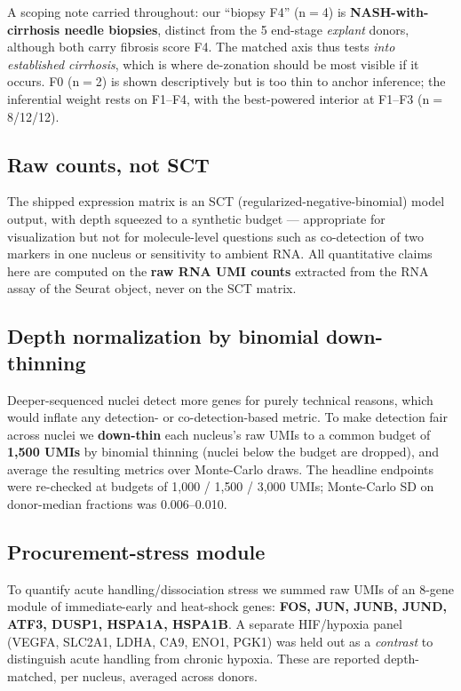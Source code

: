 \documentclass[11pt,a4paper]{article}
\begin{document}
A scoping note carried throughout: our ``biopsy F4'' (n$=$4) is \textbf{NASH-with-cirrhosis needle biopsies}, distinct from the 5 end-stage \emph{explant} donors, although both carry fibrosis score F4. The matched axis thus tests \emph{into established cirrhosis}, which is where de-zonation should be most visible if it occurs. F0 (n$=$2) is shown descriptively but is too thin to anchor inference; the inferential weight rests on F1--F4, with the best-powered interior at F1--F3 (n$=$8/12/12).

\subsection{Raw counts, not SCT}

The shipped expression matrix is an SCT (regularized-negative-binomial) model output, with depth squeezed to a synthetic budget --- appropriate for visualization but not for molecule-level questions such as co-detection of two markers in one nucleus or sensitivity to ambient RNA. All quantitative claims here are computed on the \textbf{raw RNA UMI counts} extracted from the RNA assay of the Seurat object, never on the SCT matrix.

\subsection{Depth normalization by binomial down-thinning}

Deeper-sequenced nuclei detect more genes for purely technical reasons, which would inflate any detection- or co-detection-based metric. To make detection fair across nuclei we \textbf{down-thin} each nucleus's raw UMIs to a common budget of \textbf{1{,}500 UMIs} by binomial thinning (nuclei below the budget are dropped), and average the resulting metrics over Monte-Carlo draws. The headline endpoints were re-checked at budgets of 1{,}000 / 1{,}500 / 3{,}000 UMIs; Monte-Carlo SD on donor-median fractions was 0.006--0.010.

\subsection{Procurement-stress module}

To quantify acute handling/dissociation stress we summed raw UMIs of an 8-gene module of immediate-early and heat-shock genes: \textbf{FOS, JUN, JUNB, JUND, ATF3, DUSP1, HSPA1A, HSPA1B}. A separate HIF/hypoxia panel (VEGFA, SLC2A1, LDHA, CA9, ENO1, PGK1) was held out as a \emph{contrast} to distinguish acute handling from chronic hypoxia. These are reported depth-matched, per nucleus, averaged across donors.
\end{document}
